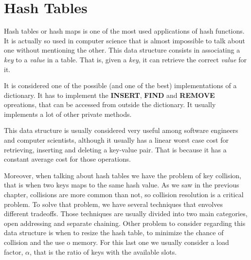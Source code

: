 \chapter{Hash Tables}
\label{cap:Hash Tables}



Hash tables or hash maps is one of the most used applications of hash functions. It is actually so used in computer science that is almost impossible to talk about one without mentioning the other. This data structure consists in associating a \textit{key} to a \textit{value} in a table. That is, given a \textit{key}, it can retrieve the correct \textit{value} for it.

It is considered one of the possible (and one of the best) implementations of a dictionary. It has to implement the \textbf{INSERT}, \textbf{FIND} and \textbf{REMOVE} opreations, that can be accessed from outside the dictionary. It usually implements a lot of other private methods. 

This data structure is usually considered very useful among software engineers and computer scientists, although it usually has a linear worst case cost for retrieving, inserting and deleting a key-value pair. That is because it has a constant average cost for those operations.

Moreover, when talking about hash tables we have the problem of key collision, that is when two keys maps to the same hash value. As we saw in the previous chapter, collisions are more common than not, so collision resolution is a critical problem. To solve that problem, we have several techniques that envolves different tradeoffs. Those techniques are usually divided into two main categories, open addressing and separate chaining. Other problem to consider regarding this data structure is when to resize the hash table, to minimize the chance of collision and the use o memory. For this last one we usually consider a load factor, \( \alpha \), that is the ratio of keys with the available slots.

